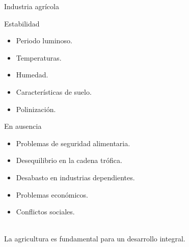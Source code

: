 \documentclass[aspectratio=169]{beamer}
\begin{document}
\begin{frame}{Industria agrícola}
\vspace{-1cm}
\begin{minipage}{0.5\textwidth}
			\pause\begin{block}{Estabilidad}
			    \begin{itemize}
				\item Periodo luminoso.
                \item Temperaturas.
                \item Humedad.
                \item Características de suelo.
                \item Polinización.
                
			\end{itemize}
			\end{block}
		\end{minipage}%
		\begin{minipage}{0.5\textwidth}
		\pause\begin{block}{En ausencia}
			\begin{itemize}
                    \item Problemas de seguridad alimentaria.
                    \item Desequilibrio en la cadena trófica.
                    \pause
                    \item Desabasto en industrias dependientes.
                    \item Problemas económicos.
                    \item Conflictos sociales.
			\end{itemize}
			\end{block}
		\end{minipage}
\pause
        \centering
        \,\\ \Large
La agricultura es fundamental para un desarrollo integral.
\end{frame}
\end{document}

